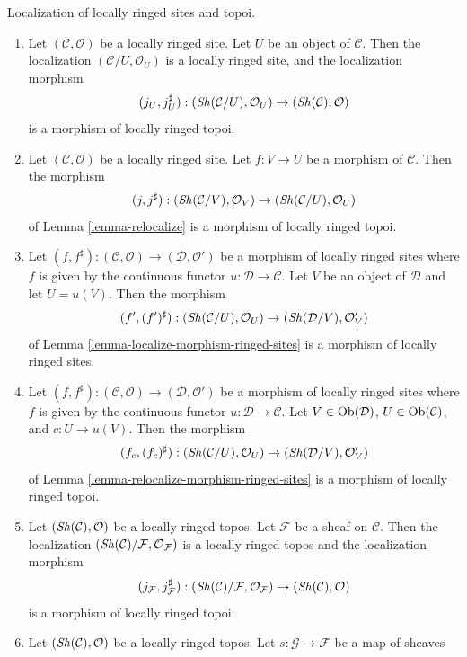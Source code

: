 \begin{lemma}
\label{lemma-localize-morphism-locally-ringed-topoi}
Localization of locally ringed sites and topoi.
\begin{enumerate}
\item Let $(\mathcal{C}, \mathcal{O})$ be a locally ringed site.
Let $U$ be an object of $\mathcal{C}$. Then the localization
$(\mathcal{C}/U, \mathcal{O}_U)$ is a locally ringed site, and
the localization morphism
$$
(j_U, j_U^\sharp) :
(\mathop{\mathit{Sh}}\nolimits(\mathcal{C}/U), \mathcal{O}_U)
\to
(\mathop{\mathit{Sh}}\nolimits(\mathcal{C}), \mathcal{O})
$$
is a morphism of locally ringed topoi.
\item Let $(\mathcal{C}, \mathcal{O})$ be a locally ringed site.
Let $f : V \to U$ be a morphism of $\mathcal{C}$.
Then the morphism
$$
(j, j^\sharp) :
(\mathop{\mathit{Sh}}\nolimits(\mathcal{C}/V), \mathcal{O}_V)
\to
(\mathop{\mathit{Sh}}\nolimits(\mathcal{C}/U), \mathcal{O}_U)
$$
of
Lemma \ref{lemma-relocalize}
is a morphism of locally ringed topoi.
\item Let
$(f, f^\sharp) :
(\mathcal{C}, \mathcal{O})
\longrightarrow
(\mathcal{D}, \mathcal{O}')$
be a morphism of locally ringed sites where $f$ is given by the continuous
functor $u : \mathcal{D} \to \mathcal{C}$. Let $V$ be an object of
$\mathcal{D}$ and let $U = u(V)$. Then the morphism
$$
(f', (f')^\sharp) :
(\mathop{\mathit{Sh}}\nolimits(\mathcal{C}/U), \mathcal{O}_U)
\to
(\mathop{\mathit{Sh}}\nolimits(\mathcal{D}/V), \mathcal{O}'_V)
$$
of
Lemma \ref{lemma-localize-morphism-ringed-sites}
is a morphism of locally ringed sites.
\item Let
$(f, f^\sharp) :
(\mathcal{C}, \mathcal{O})
\longrightarrow
(\mathcal{D}, \mathcal{O}')$
be a morphism of locally ringed sites where $f$ is given by the continuous
functor $u : \mathcal{D} \to \mathcal{C}$. Let $V \in \mathop{\mathrm{Ob}}\nolimits(\mathcal{D})$,
$U \in \mathop{\mathrm{Ob}}\nolimits(\mathcal{C})$, and $c : U \to u(V)$. Then the morphism
$$
(f_c, (f_c)^\sharp) :
(\mathop{\mathit{Sh}}\nolimits(\mathcal{C}/U), \mathcal{O}_U)
\to
(\mathop{\mathit{Sh}}\nolimits(\mathcal{D}/V), \mathcal{O}'_V)
$$
of
Lemma \ref{lemma-relocalize-morphism-ringed-sites}
is a morphism of locally ringed topoi.
\item Let $(\mathop{\mathit{Sh}}\nolimits(\mathcal{C}), \mathcal{O})$ be a locally
ringed topos. Let $\mathcal{F}$ be a sheaf on $\mathcal{C}$.
Then the localization
$(\mathop{\mathit{Sh}}\nolimits(\mathcal{C})/\mathcal{F}, \mathcal{O}_\mathcal{F})$
is a locally ringed topos and the localization morphism
$$
(j_\mathcal{F}, j_\mathcal{F}^\sharp) :
(\mathop{\mathit{Sh}}\nolimits(\mathcal{C})/\mathcal{F}, \mathcal{O}_\mathcal{F})
\to
(\mathop{\mathit{Sh}}\nolimits(\mathcal{C}), \mathcal{O})
$$
is a morphism of locally ringed topoi.
\item  Let $(\mathop{\mathit{Sh}}\nolimits(\mathcal{C}), \mathcal{O})$ be a locally
ringed topos. Let $s : \mathcal{G} \to \mathcal{F}$ be a map of sheaves

\end{enumerate}
\end{lemma}
